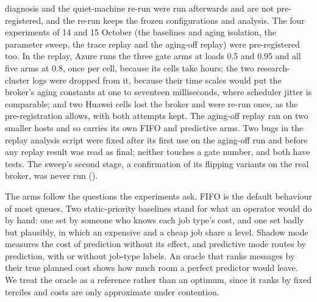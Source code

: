 diagnosis and the quiet-machine re-run were run afterwards and are not pre-registered, and the re-run keeps the frozen configurations and analysis. The four experiments of 14 and 15 October (the baselines and aging isolation, the parameter sweep, the trace replay and the aging-off replay) were pre-registered too. In the replay, Azure runs the three gate arms at loads 0.5 and 0.95 and all five arms at 0.8, once per cell, because its cells take hours; the two research-cluster logs were dropped from it, because their time scales would put the broker's aging constants at one to seventeen milliseconds, where scheduler jitter is comparable; and two Huawei cells lost the broker and were re-run once, as the pre-registration allows, with both attempts kept. The aging-off replay ran on two smaller hosts and so carries its own FIFO and predictive arms. Two bugs in the replay analysis script were fixed after its first use on the aging-off run and before any replay result was read as final; neither touches a gate number, and both have tests. The sweep's second stage, a confirmation of its flipping variants on the real broker, was never run ().

The arms follow the questions the experiments ask. FIFO is the default behaviour of most queues. Two static-priority
baselines stand for what an operator would do by hand: one set by someone who knows each job type's cost, and one set badly
but plausibly, in which an expensive and a cheap job share a level. Shadow mode measures the cost of prediction without its
effect, and predictive mode routes by prediction, with or without job-type labels. An oracle that ranks messages by their
true planned cost shows how much room a perfect predictor would leave. We treat the oracle as a reference rather than an
optimum, since it ranks by fixed terciles and costs are only approximate under contention.

